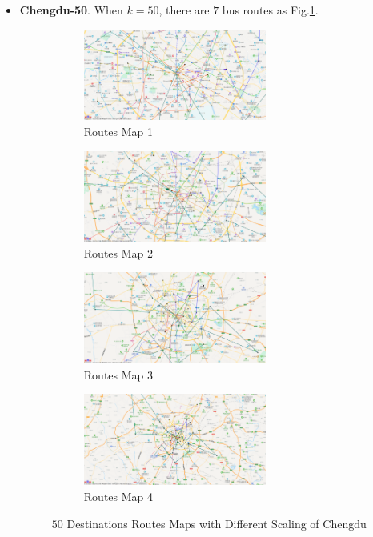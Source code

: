 \documentclass{llncs}
\begin{document}
\begin{itemize}
	\item \textbf{Chengdu-50}. When $k=50$, there are $7$ bus routes as Fig.\ref{fig-cd-50}.

		\begin{figure}[htbp]
		\centering
		\begin{subfigure}[t]{0.45\textwidth}
			\begin{minipage}{6cm}
				\centering
				\includegraphics[width=6cm]{figures/cd_50_1.png}
				\caption{Routes Map 1}
			\end{minipage}%
		\end{subfigure}
		\begin{subfigure}[t]{0.45\textwidth}
			\begin{minipage}{6cm}
				\centering
				\includegraphics[width=6cm]{figures/cd_50_2.png}
				\caption{Routes Map 2}
			\end{minipage}
		\end{subfigure}
		\begin{subfigure}[t]{0.45\textwidth}
			\begin{minipage}{6cm}
				\centering
				\includegraphics[width=6cm]{figures/cd_50_3.png}
				\caption{Routes Map 3}
			\end{minipage}%
		\end{subfigure}
		\begin{subfigure}[t]{0.45\textwidth}
			\begin{minipage}{6cm}
				\centering
				\includegraphics[width=6cm]{figures/cd_50_4.png}
				\caption{Routes Map 4}
			\end{minipage}
		\end{subfigure}
		\caption{$50$ Destinations Routes Maps with Different Scaling of Chengdu}
		\label{fig-cd-50}
		\end{figure}
	

\end{itemize}
\end{document}
